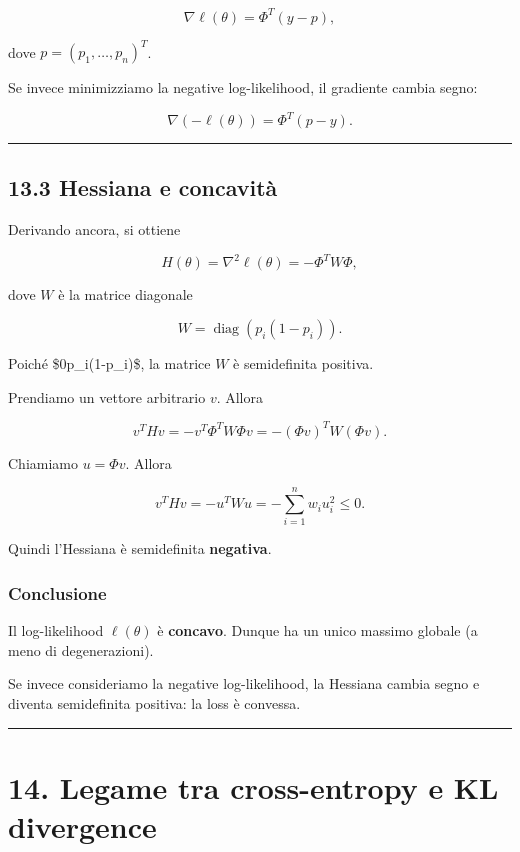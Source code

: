 \documentclass[
]{article}
\begin{document}
\[
\nabla \ell(\theta)=\Phi^T(y-p),
\]

dove \(p=(p_1,\dots,p_n)^T\).

Se invece minimizziamo la negative log-likelihood, il gradiente cambia
segno:

\[
\nabla(-\ell(\theta))=\Phi^T(p-y).
\]

\begin{center}\rule{0.5\linewidth}{0.5pt}\end{center}

\subsection{13.3 Hessiana e concavità}\label{hessiana-e-concavituxe0}

Derivando ancora, si ottiene

\[
H(\theta)=\nabla^2 \ell(\theta)
=
-\Phi^T W \Phi,
\]

dove \(W\) è la matrice diagonale

\[
W = \operatorname{diag}(p_i(1-p_i)).
\]

Poiché \$0\le p\_i(1-p\_i)\$, la matrice \(W\) è semidefinita positiva.

Prendiamo un vettore arbitrario \(v\). Allora

\[
v^THv
=
-v^T\Phi^T W \Phi v
=
-(\Phi v)^T W (\Phi v).
\]

Chiamiamo \(u=\Phi v\). Allora

\[
v^THv = -u^TWu = -\sum_{i=1}^n w_i u_i^2 \le 0.
\]

Quindi l'Hessiana è semidefinita \textbf{negativa}.

\subsubsection{Conclusione}\label{conclusione-7}

Il log-likelihood \(\ell(\theta)\) è \textbf{concavo}. Dunque ha un
unico massimo globale (a meno di degenerazioni).

Se invece consideriamo la negative log-likelihood, la Hessiana cambia
segno e diventa semidefinita positiva: la loss è convessa.

\begin{center}\rule{0.5\linewidth}{0.5pt}\end{center}

\section{14. Legame tra cross-entropy e KL
divergence}\label{legame-tra-cross-entropy-e-kl-divergence}
\end{document}
